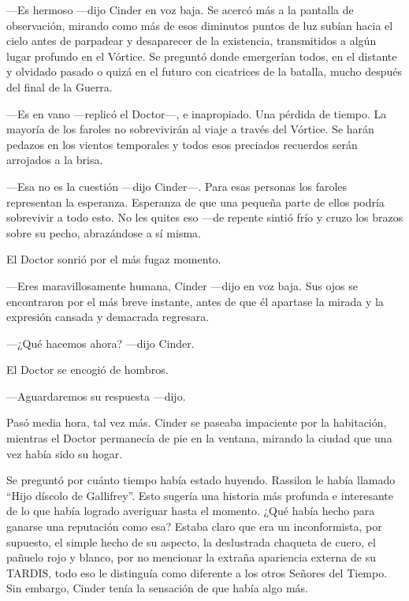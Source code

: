 —Es hermoso —dijo Cinder en voz baja. Se acercó más a la pantalla de observación, mirando como más de esos diminutos puntos de luz subían hacia el cielo antes de parpadear y desaparecer de la existencia, transmitidos a algún lugar profundo en el Vórtice. Se preguntó donde emergerían todos, en el distante y olvidado pasado o quizá en el futuro con cicatrices de la batalla, mucho después del final de la Guerra. 



—Es en vano —replicó el Doctor—, e inapropiado. Una pérdida de tiempo. La mayoría de los faroles no sobrevivirán al viaje a través del Vórtice. Se harán pedazos en los vientos temporales y todos esos preciados recuerdos serán arrojados a la brisa. 



—Esa no es la cuestión —dijo Cinder—. Para esas personas los faroles representan la esperanza. Esperanza de que una pequeña parte de ellos podría sobrevivir a todo esto. No les quites eso —de repente sintió frío y cruzo los brazos sobre su pecho, abrazándose a sí misma. 



El Doctor sonrió por el más fugaz momento. 



—Eres maravillosamente humana, Cinder —dijo en voz baja. Sus ojos se encontraron por el más breve instante, antes de que él apartase la mirada y la expresión cansada y demacrada regresara. 



—¿Qué hacemos ahora? —dijo Cinder. 



El Doctor se encogió de hombros. 



—Aguardaremos su respuesta —dijo.

 

Pasó media hora, tal vez más. Cinder se paseaba impaciente por la habitación, mientras el Doctor permanecía de pie en la ventana, mirando la ciudad que una vez había sido su hogar. 

Se preguntó por cuánto tiempo había estado huyendo. Rassilon le había llamado “Hijo díscolo de Gallifrey”. Esto sugería una historia más profunda e interesante de lo que había logrado averiguar hasta el momento. ¿Qué había hecho para ganarse una reputación como esa? Estaba claro que era un inconformista, por supuesto, el simple hecho de su aspecto, la deslustrada chaqueta de cuero, el pañuelo rojo y blanco, por no mencionar la extraña apariencia externa de su TARDIS, todo eso le distinguía como diferente a los otros Señores del Tiempo. Sin embargo, Cinder tenía la sensación de que había algo más. 

